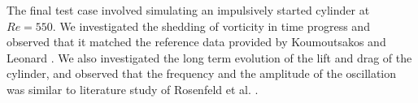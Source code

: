 The final test case involved simulating an impulsively started cylinder at $Re=550$. We investigated the shedding of vorticity in time progress and observed that it matched the reference data provided by Koumoutsakos and Leonard \cite{Koumoutsakos1995a}. We also investigated the long term evolution of the lift and drag of the cylinder, and observed that the frequency and the amplitude of the oscillation was similar to literature study of Rosenfeld et al. \cite{MosheRosenFeldDochanKwak1991}.

%


